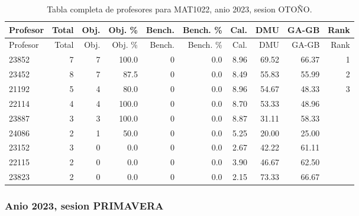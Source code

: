 \begingroup
\scriptsize
\setlength{\tabcolsep}{3pt}
\begin{longtable}{lrrrrrrrrr}
\caption{Tabla completa de profesores para MAT1022, anio 2023, sesion OTOÑO.}\label{tab:prof-period-mat1022-2023-oto-o-especializado}\\
\toprule
Profesor & Total & Obj. & Obj. \% & Bench. & Bench. \% & Cal. & DMU & GA-GB & Rank \\
\midrule
\endfirsthead
\toprule
Profesor & Total & Obj. & Obj. \% & Bench. & Bench. \% & Cal. & DMU & GA-GB & Rank \\
\midrule
\endhead
23852 & 7 & 7 & 100.0 & 0 & 0.0 & 8.96 & 69.52 & 66.37 & 1 \\
23452 & 8 & 7 & 87.5 & 0 & 0.0 & 8.49 & 55.83 & 55.99 & 2 \\
21192 & 5 & 4 & 80.0 & 0 & 0.0 & 8.96 & 54.67 & 48.33 & 3 \\
22114 & 4 & 4 & 100.0 & 0 & 0.0 & 8.70 & 53.33 & 48.96 &  \\
23887 & 3 & 3 & 100.0 & 0 & 0.0 & 8.87 & 31.11 & 58.33 &  \\
24086 & 2 & 1 & 50.0 & 0 & 0.0 & 5.25 & 20.00 & 25.00 &  \\
23152 & 3 & 0 & 0.0 & 0 & 0.0 & 2.67 & 42.22 & 61.11 &  \\
22115 & 2 & 0 & 0.0 & 0 & 0.0 & 3.90 & 46.67 & 62.50 &  \\
23823 & 2 & 0 & 0.0 & 0 & 0.0 & 2.15 & 73.33 & 66.67 &  \\
\bottomrule
\end{longtable}
\endgroup

\subsubsection{Anio 2023, sesion PRIMAVERA}

